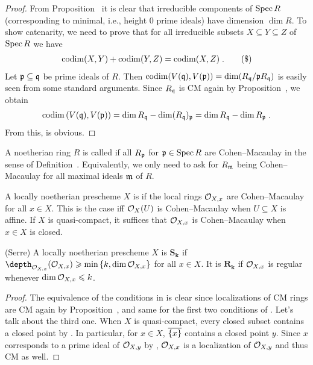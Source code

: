 \documentclass[a4paper,parskip=half,numbers=enddot, DIV=12]{scrreprt}
\renewcommand{\geq}{\geqslant}
\renewcommand{\leq}{\leqslant}
\begin{document}
\begin{proof}
	From Proposition~ it is clear that irreducible components of $\operatorname{Spec} R$ (corresponding to minimal, i.e., height $0$ prime ideals) have dimension $\dim R$. To show catenarity, we need to prove that for all irreducible subsets $X\subseteq Y\subseteq Z$ of $\operatorname{Spec} R$ we have
	\begin{align}\lbl{eq:catenarity}
		\codim(X,Y)+\codim(Y,Z)=\codim(X,Z)\;.\tag{\$}
	\end{align}
	Let $\mathfrak{p}\subseteq \mathfrak{q}$ be prime ideals of $R$. Then $\operatorname{codim}(V(\mathfrak{q}),V(\mathfrak{p}))=\dim(R_{\mathfrak{q}}/\mathfrak{p} R_{\mathfrak{q}})$ is easily seen from some standard arguments. Since $R_{\mathfrak{q}}$ is CM again by Proposition~, we obtain
	\begin{align*}
		\operatorname{codim}\left(V(\mathfrak{q}),V(\mathfrak{p})\right)=\dim R_{\mathfrak{q}}-\dim (R_{\mathfrak{q}})_{\mathfrak{p}}=\dim R_{\mathfrak{q}}-\dim R_{\mathfrak{p}}\;.
	\end{align*}
	From this,  is obvious.
\end{proof}
\begin{defi}
	\begin{alphanumerate}
		\item A noetherian ring $R$ is called  if all $R_{\mathfrak{p}}$ for $\mathfrak{p}\in\operatorname{Spec} R$ are Cohen--Macaulay in the sense of Definition~. Equivalently, we only need to ask for $R_{\mathfrak{m}}$ being Cohen--Macaulay for all maximal ideals $\mathfrak{m}$ of $R$.
		\item A locally noetherian prescheme $X$ is  if the local rings $\mathcal{O}_{X,x}$ are Cohen--Macaulay for all $x\in X$. This is the case iff $\mathcal{O}_X(U)$ is Cohen--Macaulay when $U\subseteq X$ is affine. If $X$ is quasi-compact, it suffices that $\mathcal{O}_{X,x}$ is Cohen--Macaulay when $x\in X$ is closed.
		\item (Serre) A locally noetherian prescheme $X$ is $\boldsymbol{S_k}$ if $\depth_{\Oo_{X,x}}(\Oo_{X,x})\geq \min\left\{k,\dim\Oo_{X,x}\right\}$ for all $x\in X$. It is $\boldsymbol{R_k}$ if $\mathcal{O}_{X,x}$ is regular whenever $\dim\Oo_{X,x}\leq k$.
	\end{alphanumerate}
\end{defi}
\begin{proof}
	The equivalence of the conditions in  is clear since localizations of CM rings are CM again by Proposition~, and same for the first two conditions of . Let's talk about the third one. When $X$ is quasi-compact, every closed subset contains a closed point by \cite[Proposition~2.1.1]{alggeo1}. In particular, for $x\in X$, $\overline{\{x\}}$ contains a closed point $y$. Since $x$ corresponds to a prime ideal of $\mathcal{O}_{X,y}$ by \cite[Proposition~2.1.3]{alggeo1}, $\mathcal{O}_{X,x}$ is a localization of $\mathcal{O}_{X,y}$ and thus CM as well.
\end{proof}
\end{document}
